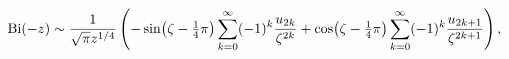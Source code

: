 \[\mathop{\mathrm{Bi}\/}\nolimits\!\left(-z\right)\sim\frac{1}{\sqrt{\pi}z^{1/4}%
}\left(-\mathop{\sin\/}\nolimits\!\left(\zeta-\tfrac{1}{4}\pi\right)\sum_{k=0}%
^{\infty}(-1)^{k}\frac{u_{2k}}{\zeta^{2k}}+\mathop{\cos\/}\nolimits\!\left(%
\zeta-\tfrac{1}{4}\pi\right)\sum_{k=0}^{\infty}(-1)^{k}\frac{u_{2k+1}}{\zeta^{%
2k+1}}\right),\]